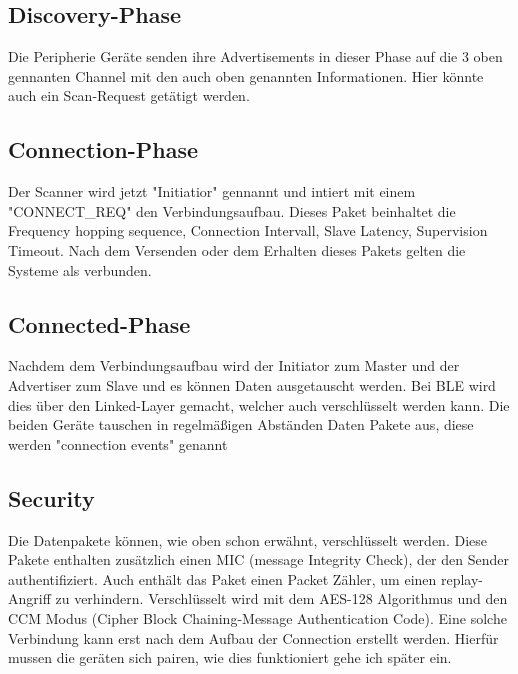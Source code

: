 \documentclass[a4paper,11pt,singlespacing]{article}
\begin{document}
		\subsection{Discovery-Phase}
		Die Peripherie Geräte senden ihre Advertisements in dieser Phase auf die 3 oben gennanten Channel mit den auch oben genannten Informationen. Hier könnte auch ein Scan-Request getätigt werden.
		\subsection{Connection-Phase}
		Der Scanner wird jetzt "Initiatior" gennannt und intiert mit einem "CONNECT\_REQ" den Verbindungsaufbau. Dieses Paket beinhaltet die Frequency hopping sequence, Connection Intervall, Slave Latency, Supervision Timeout. Nach dem Versenden oder dem Erhalten dieses Pakets gelten die Systeme als verbunden. \cite{michrochip_dev_connection}
		\subsection{Connected-Phase}
		Nachdem dem Verbindungsaufbau wird der Initiator zum Master und der Advertiser zum Slave und es können Daten ausgetauscht werden. Bei BLE wird dies über den Linked-Layer gemacht, welcher auch verschlüsselt werden kann. Die beiden Geräte tauschen in regelmäßigen Abständen Daten Pakete aus, diese werden "connection events" genannt
		
		\subsection{Security}
		Die Datenpakete können, wie oben schon erwähnt, verschlüsselt werden. Diese Pakete enthalten zusätzlich einen MIC (message Integrity Check), der den Sender authentifiziert. Auch enthält das Paket einen Packet Zähler, um einen replay-Angriff zu verhindern. Verschlüsselt wird mit dem AES-128 Algorithmus und den CCM Modus (Cipher Block Chaining-Message Authentication Code). Eine solche Verbindung kann erst nach dem Aufbau der Connection erstellt werden. Hierfür mussen die geräten sich pairen, wie dies funktioniert gehe ich später ein.
		
\end{document}
